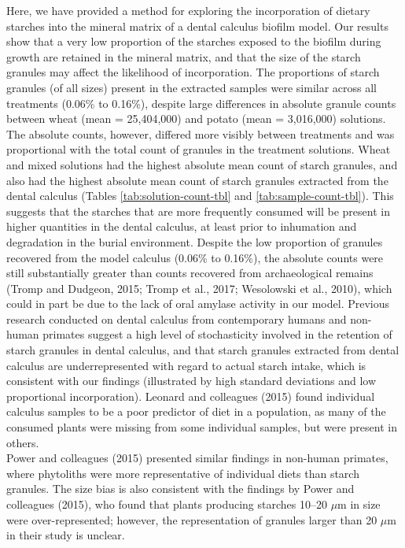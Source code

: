 \documentclass[utf8]{frontiers/frontiersSCNS}
\begin{document}
Here, we have provided a method for exploring the incorporation of dietary
starches into the mineral matrix of a dental calculus biofilm model. Our results show
that a very low proportion of the starches exposed to the biofilm during growth are
retained in the mineral matrix, and that the size of the starch granules
may affect the likelihood of incorporation. The proportions of starch granules
(of all sizes) present in the extracted samples were similar across all treatments
(0.06\% to 0.16\%),
despite large differences in absolute granule counts between wheat
(mean = 25,404,000)
and potato
(mean = 3,016,000)
solutions.\\
The absolute counts, however, differed more visibly between treatments and was
proportional with the total count of granules in the treatment solutions. Wheat
and mixed solutions had the highest absolute mean count of starch granules, and
also had the highest absolute mean count of starch granules extracted from the
dental calculus
(Tables \ref{tab:solution-count-tbl} and \ref{tab:sample-count-tbl}).
This suggests that the starches that are more frequently consumed will be present
in higher quantities in the dental calculus, at least prior to inhumation and
degradation in the burial environment.
Despite the low proportion of granules recovered from the model calculus
(0.06\% to 0.16\%),
the absolute counts were still substantially greater than counts recovered from
archaeological remains
(Tromp and Dudgeon, 2015; Tromp et al., 2017; Wesolowski et al., 2010), which could in part be due to the
lack of oral amylase activity in our model.
Previous research conducted on dental calculus from contemporary humans and non-human
primates suggest a high level of stochasticity involved in the retention of
starch granules in dental calculus, and that starch granules extracted from dental
calculus are underrepresented with regard
to actual starch intake, which is consistent with our findings (illustrated by high
standard deviations and low proportional incorporation).
Leonard and colleagues (2015) found individual
calculus samples to be a poor predictor of diet in a population, as many of the
consumed plants were missing from some individual samples, but were present in others.\\
Power and colleagues (2015)
presented similar findings in non-human primates, where phytoliths were more
representative of individual diets than starch granules.
The size bias is also consistent with the findings by Power and colleagues
(2015),
who found that plants producing starches 10--20 \(\mu\)m in
size were over-represented; however, the representation of granules larger than
20 \(\mu\)m in their study is unclear.
\end{document}
